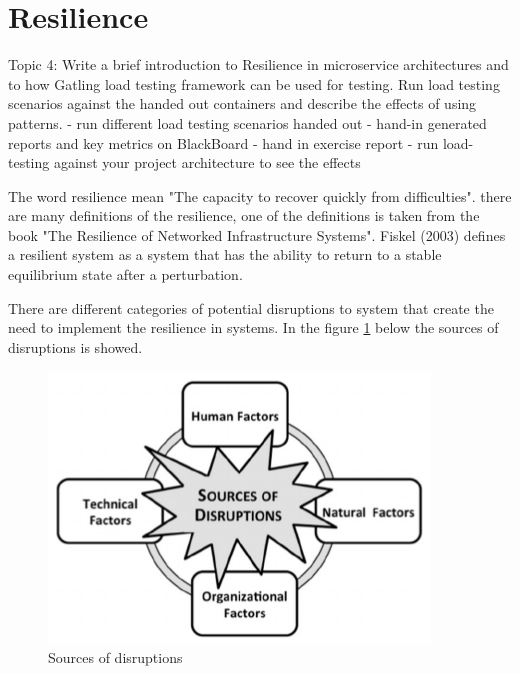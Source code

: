 \chapter{Resilience}\label{ch:resilience}
Topic 4: Write a brief introduction to Resilience in microservice architectures and to how Gatling load testing framework can be used for testing. Run load testing scenarios against the handed out containers and describe the effects of using patterns.
- run different load testing scenarios handed out
- hand-in generated reports and key metrics on BlackBoard 
- hand in exercise report
- run load-testing against your project architecture to see the effects

The word resilience mean "The capacity to recover quickly from difficulties". there are many definitions of the resilience, one of the definitions is taken from the book "The Resilience of Networked Infrastructure Systems". Fiskel (2003) defines a resilient system as a system that has the ability to return to a stable equilibrium state after a perturbation. 

There are different categories of potential disruptions to system that create the need to implement the resilience in systems. In the figure \ref{ch:resilience} below the sources of disruptions is showed. 

\begin{figure}[bth]
	\includegraphics[width=0.7\linewidth]{gfx/resilience}
	\caption[routingtable]{Sources of disruptions} \label{fig:resilience}
\end{figure}   

